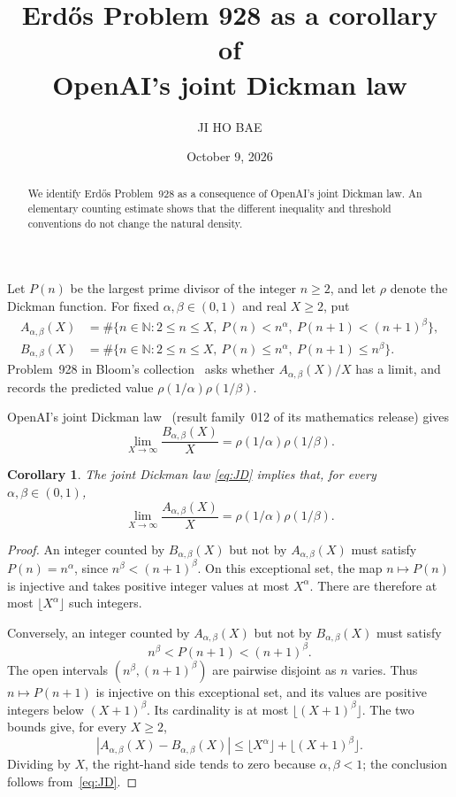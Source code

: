 \documentclass[11pt,a4paper]{amsart}
\title{Erd\H{o}s Problem 928 as a corollary of\\
OpenAI's joint Dickman law}
\author{JI HO BAE}
\date{October 9, 2026}
\newtheorem{corollary}{Corollary}
\newcommand{\N}{\mathbb N}
\begin{document}
\begin{abstract}
We identify Erd\H{o}s Problem~928 as a consequence of OpenAI's joint
Dickman law. An elementary counting estimate shows that the different
inequality and threshold conventions do not change the natural density.
\end{abstract}
\maketitle

Let $P(n)$ be the largest prime divisor of the integer $n\ge2$, and let
$\rho$ denote the Dickman function. For fixed $\alpha,\beta\in(0,1)$
and real $X\ge2$, put
\begin{align*}
 A_{\alpha,\beta}(X)
   &=\#\{n\in\N:2\le n\le X,\ P(n)<n^\alpha,
                         \ P(n+1)<(n+1)^\beta\},\\
 B_{\alpha,\beta}(X)
   &=\#\{n\in\N:2\le n\le X,\ P(n)\le n^\alpha,
                         \ P(n+1)\le n^\beta\}.
\end{align*}
Problem~928 in Bloom's collection~\cite{Bloom928} asks whether
$A_{\alpha,\beta}(X)/X$ has a limit, and records the predicted value
$\rho(1/\alpha)\rho(1/\beta)$.

OpenAI's joint Dickman law~\cite[Theorem~1.1, p.~2]{OpenAI2026}
(result family~012 of its mathematics release) gives
\begin{equation}\label{eq:JD}
 \lim_{X\to\infty}\frac{B_{\alpha,\beta}(X)}X
   =\rho(1/\alpha)\rho(1/\beta).
\end{equation}
\begin{corollary}\label{cor:928}
The joint Dickman law \eqref{eq:JD} implies that, for every
$\alpha,\beta\in(0,1)$,
\[
  \lim_{X\to\infty}\frac{A_{\alpha,\beta}(X)}X
   =\rho(1/\alpha)\rho(1/\beta).
\]
\end{corollary}

\begin{proof}
An integer counted by $B_{\alpha,\beta}(X)$ but not by
$A_{\alpha,\beta}(X)$ must satisfy $P(n)=n^\alpha$, since
$n^\beta<(n+1)^\beta$. On this exceptional set, the map $n\mapsto P(n)$
is injective and takes positive integer values at most $X^\alpha$.
There are therefore at most $\lfloor X^\alpha\rfloor$ such integers.

Conversely, an integer counted by $A_{\alpha,\beta}(X)$ but not by
$B_{\alpha,\beta}(X)$ must satisfy
\[
 n^\beta<P(n+1)<(n+1)^\beta.
\]
The open intervals $(n^\beta,(n+1)^\beta)$ are pairwise disjoint as
$n$ varies. Thus $n\mapsto P(n+1)$ is injective on this exceptional
set, and its values are positive integers below $(X+1)^\beta$.
Its cardinality is at most $\lfloor(X+1)^\beta\rfloor$.
The two bounds give, for every $X\ge2$,
\begin{equation}\label{eq:error}
 |A_{\alpha,\beta}(X)-B_{\alpha,\beta}(X)|
   \le \lfloor X^\alpha\rfloor+\lfloor(X+1)^\beta\rfloor.
\end{equation}
Dividing by $X$, the right-hand
side tends to zero because $\alpha,\beta<1$; the conclusion follows
from~\eqref{eq:JD}.
\end{proof}
\end{document}
